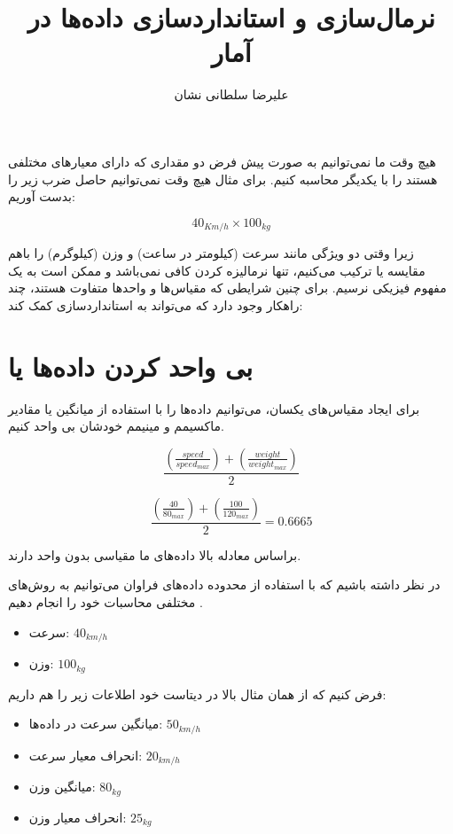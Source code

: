 \documentclass[a4paper]{article}
\title{نرمال‌سازی و استانداردسازی داده‌ها در آمار}
\author{علیرضا سلطانی نشان}
\begin{document}
\maketitle

هیچ وقت ما نمی‌توانیم به صورت پیش فرض دو مقداری که دارای معیار‌های مختلفی هستند
را با یکدیگر محاسبه کنیم. برای مثال هیچ وقت نمی‌توانیم حاصل ضرب زیر را بدست
آوریم:

\begin{equation}
    40_{Km/h} \times 100_{kg}
\end{equation}

زیرا وقتی دو ویژگی مانند سرعت (کیلومتر در ساعت) و وزن (کیلوگرم) را باهم مقایسه
یا ترکیب می‌کنیم، تنها نرمالیزه کردن کافی نمی‌باشد و ممکن است به یک مفهوم فیزیکی
نرسیم. برای چنین شرایطی که مقیاس‌ها و واحد‌ها متفاوت هستند، چند راهکار وجود دارد
که می‌تواند به استاندارد‌سازی کمک کند:

\section*{بی واحد کردن داده‌ها یا }

برای ایجاد مقیاس‌های یکسان، می‌توانیم داده‌ها را با استفاده از میانگین یا مقادیر
ماکسیمم و مینیمم خودشان بی واحد کنیم.

\begin{equation}
    \frac{(\frac{speed}{speed_{max}}) + (\frac{weight}{weight_{max}})}{2}
\end{equation}

\begin{equation}
    \frac{(\frac{40}{80_{max}}) + (\frac{100}{120_{max}})}{2} = 0.6665
\end{equation}

براساس معادله بالا داده‌های ما مقیاسی بدون واحد دارند.

در نظر داشته باشیم که با استفاده از محدوده داده‌های فراوان می‌توانیم به روش‌های
مختلفی محاسبات خود را انجام دهیم \cite{enwiki:1203519063}.

\begin{itemize}
    \item سرعت: $40_{km/h}$
    \item وزن: $100_{kg}$
\end{itemize}

فرض کنیم که از همان مثال بالا در دیتاست خود اطلاعات زیر را هم داریم:

\begin{itemize}
    \item میانگین سرعت در داده‌ها: $50_{km/h}$
    \item انحراف معیار سرعت: $20_{km/h}$
    \item میانگین وزن: $80_{kg}$
    \item انحراف معیار وزن: $25_{kg}$
\end{itemize}
\end{document}
